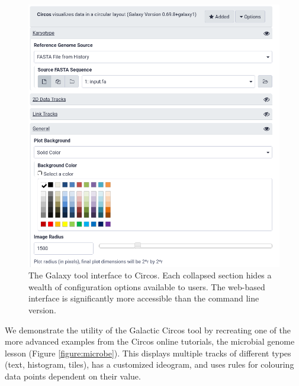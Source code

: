 \begin{figure}[h!]
\centering
\includegraphics[width=0.8\linewidth]{chapters/images/circos/circos-galaxy-ui.png}
\caption{The Galaxy tool interface to Circos. Each collapsed section hides a wealth of configuration options available to users. The web-based interface is significantly more accessible than the command line version.}\label{figure:userinterface}
\end{figure}

We demonstrate the utility of the Galactic Circos tool by recreating one of the more advanced examples from the Circos online tutorials, the microbial genome lesson \cite{circos-microbial-example} (Figure \ref{figure:microbe}). This displays multiple tracks of different types (text, histogram, tiles), has a customized ideogram, and uses rules for colouring data points dependent on their value.

